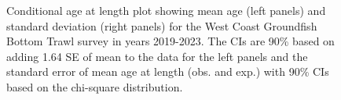 \documentclass[
]{scrartcl}
\begin{document}
\begin{figure}[H]


\caption{\label{fig-call-plot-wcgbts5}Conditional age at length plot
showing mean age (left panels) and standard deviation (right panels) for
the West Coast Groundfish Bottom Trawl survey in years 2019-2023. The
CIs are 90\% based on adding 1.64 SE of mean to the data for the left
panels and the standard error of mean age at length (obs. and exp.) with
90\% CIs based on the chi-square distribution.}

\end{figure}%
\end{document}
